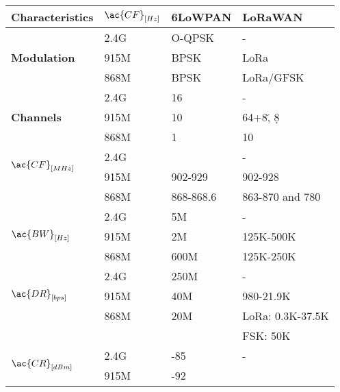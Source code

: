 \begin{table}
\centering
\begin{tabular}{l|l|l|l}
	\bf{Characteristics}               & $\ac{CF}_{[Hz]}$ & \bf{6LoWPAN} & \bf{LoRaWAN}     \\\hline
	\multirow{3}{*}{\bf{Modulation}}   & 2.4G             & O-QPSK       & -                \\
	\                                  & 915M             & BPSK         & LoRa             \\
	\                                  & 868M             & BPSK         & LoRa/GFSK        \\\hline
	\multirow{3}{*}{\bf{Channels}}     & 2.4G             & 16           & -                \\
	\                                  & 915M             & 10           & 64+8\u, 8\d      \\
	\                                  & 868M             & 1            & 10               \\\hline
	\multirow{2}{*}{$\ac{CF}_{[MHz]}$} & 2.4G             & \ko          & -                \\
	\                                  & 915M             & 902-929      & 902-928          \\
	\                                  & 868M             & 868-868.6    & 863-870 and 780  \\\hline
	\multirow{3}{*}{$\ac{BW}_{[Hz]}$}  & 2.4G             & 5M           & -                \\
	\                                  & 915M             & 2M           & 125K-500K        \\
	\                                  & 868M             & 600M         & 125K-250K        \\\hline
	\multirow{3}{*}{$\ac{DR}_{[bps]}$} & 2.4G             & 250M         & -                \\
	\                                  & 915M             & 40M          & 980-21.9K        \\
	\                                  & 868M             & 20M          & LoRa: 0.3K-37.5K \\
	\                                  &                  &              & FSK:	50K         \\\hline
	\multirow{3}{*}{$\ac{CR}_{[dBm]}$} & 2.4G             & -85          & -                \\
	\                                  & 915M             & -92          & \ko              \\

\end{tabular}
\end{table}
